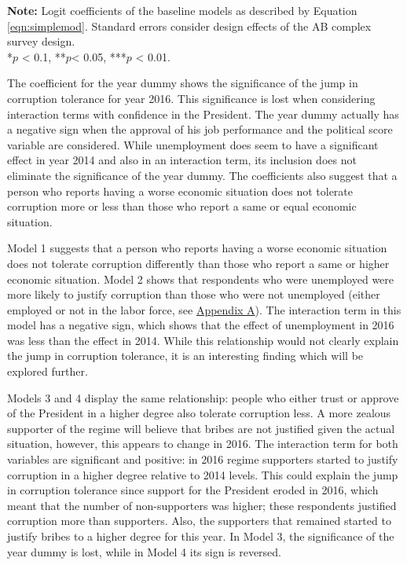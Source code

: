 \documentclass[12pt,a4]{article}
\begin{document}
\begin{table}[htbp]
\vspace{0.25cm}
\textbf{Note:} Logit coefficients of the baseline models as described by Equation \ref{eqn:simplemod}. Standard errors consider design effects of the AB complex survey design.\\
*$p$ < 0.1, **$p$< 0.05, ***$p$ < 0.01.
\end{table}

The coefficient for the year dummy shows the significance of the jump in corruption tolerance for year 2016. This significance is lost when considering interaction terms with confidence in the President. The year dummy actually has a negative sign when the approval of his job performance and the political score variable are considered. While unemployment does seem to have a significant effect in year 2014 and also in an interaction term, its inclusion does not eliminate the significance of the year dummy. The coefficients also suggest that a person who reports having a worse economic situation does not tolerate corruption more or less than those who report a same or equal economic situation. 

Model 1 suggests that a person who reports having a worse economic situation does not tolerate corruption differently than those who report a same or higher economic situation. Model 2 shows that respondents who were unemployed were more likely to justify corruption than those who were not unemployed (either employed or not in the labor force, see \hyperref[app:first]{Appendix A}). The interaction term in this model has a negative sign, which shows that the effect of unemployment in 2016 was less than the effect in 2014. While this relationship would not clearly explain the jump in corruption tolerance, it is an interesting finding which will be explored further. 

Models 3 and 4 display the same relationship: people who either trust or approve of the President in a higher degree also tolerate corruption less. A more zealous supporter of the regime will believe that bribes are not justified given the actual situation, however, this appears to change in 2016. The interaction term for both variables are significant and positive: in 2016 regime supporters started to justify corruption in a higher degree relative to 2014 levels. This could explain the jump in corruption tolerance since support for the President eroded in 2016, which meant that the number of non-supporters was higher; these respondents justified corruption more than supporters. Also, the supporters that remained started to justify bribes to a higher degree for this year. In Model 3, the significance of the year dummy is lost, while in Model 4 its sign is reversed.
\end{document}
